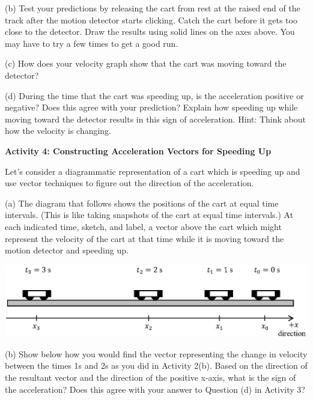 (b) Test your predictions by releasing the cart from rest at the raised end of the track after the motion detector starts clicking. Catch the cart before it gets too close to the detector.  
Draw the results using solid lines on the axes above. You may have to try a
few times to get a good run.

(c) How does your velocity graph show that the cart was moving toward the detector? 
\answerspace{20mm}

(d) During the time that the cart was speeding up, is the acceleration positive
or negative? Does this agree with your prediction? Explain how speeding up while
moving toward the detector results in this sign of acceleration. Hint: Think
about how the velocity is changing.
\answerspace{20mm}

\pagebreak[2]
\textbf{Activity 4: Constructing Acceleration Vectors for Speeding Up} 

Let's consider a diagrammatic representation of a cart which is speeding up
and use vector techniques to figure out the direction of the acceleration.

(a) The diagram that follows shows the positions of the cart at equal time intervals.
(This is like taking snapshots of the cart at equal time intervals.) At each
indicated time, sketch, and label, a vector above the cart which might represent the velocity
of the cart at that time while it is moving toward the motion detector and speeding
up.

{\par\centering \includegraphics{slowing/carts_speeding.eps} \par}

(b) Show below how you would find the vector representing the change in velocity
between the times 1s and 2s as you did in Activity 2(b). Based on the 
direction of the resultant vector and the direction of the positive x-axis, 
what is the sign of the acceleration? 
Does this agree with your answer to Question (d) in Activity 3?
\vspace{20mm}

